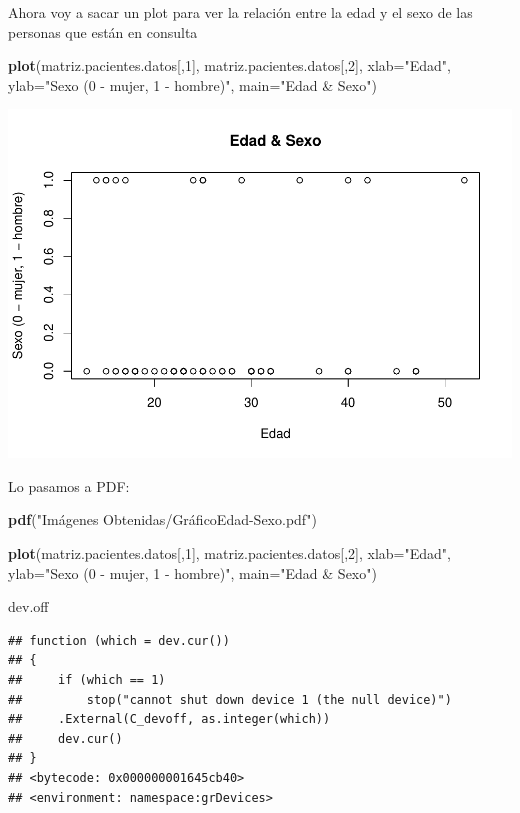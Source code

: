 \documentclass[]{article}
\newenvironment{Shaded}{\begin{snugshade}}{\end{snugshade}}
\newcommand{\DataTypeTok}[1]{\textcolor[rgb]{0.13,0.29,0.53}{#1}}
\newcommand{\DecValTok}[1]{\textcolor[rgb]{0.00,0.00,0.81}{#1}}
\newcommand{\KeywordTok}[1]{\textcolor[rgb]{0.13,0.29,0.53}{\textbf{#1}}}
\newcommand{\NormalTok}[1]{#1}
\newcommand{\StringTok}[1]{\textcolor[rgb]{0.31,0.60,0.02}{#1}}
\begin{document}
Ahora voy a sacar un plot para ver la relación entre la edad y el sexo
de las personas que están en consulta

\begin{Shaded}
\begin{Highlighting}[]
\KeywordTok{plot}\NormalTok{(matriz.pacientes.datos[,}\DecValTok{1}\NormalTok{], matriz.pacientes.datos[,}\DecValTok{2}\NormalTok{], }\DataTypeTok{xlab=}\StringTok{"Edad"}\NormalTok{, }\DataTypeTok{ylab=}\StringTok{"Sexo (0 - mujer, 1 - hombre)"}\NormalTok{, }\DataTypeTok{main=}\StringTok{"Edad & Sexo"}\NormalTok{)}
\end{Highlighting}
\end{Shaded}

\includegraphics{codigo_files/figure-latex/grafico_edad_sexo-1.pdf}

Lo pasamos a PDF:

\begin{Shaded}
\begin{Highlighting}[]
\KeywordTok{pdf}\NormalTok{(}\StringTok{"Imágenes Obtenidas/GráficoEdad-Sexo.pdf"}\NormalTok{)}

\KeywordTok{plot}\NormalTok{(matriz.pacientes.datos[,}\DecValTok{1}\NormalTok{], matriz.pacientes.datos[,}\DecValTok{2}\NormalTok{], }\DataTypeTok{xlab=}\StringTok{"Edad"}\NormalTok{, }\DataTypeTok{ylab=}\StringTok{"Sexo (0 - mujer, 1 - hombre)"}\NormalTok{, }\DataTypeTok{main=}\StringTok{"Edad & Sexo"}\NormalTok{)}

\NormalTok{dev.off}
\end{Highlighting}
\end{Shaded}

\begin{verbatim}
## function (which = dev.cur()) 
## {
##     if (which == 1) 
##         stop("cannot shut down device 1 (the null device)")
##     .External(C_devoff, as.integer(which))
##     dev.cur()
## }
## <bytecode: 0x000000001645cb40>
## <environment: namespace:grDevices>
\end{verbatim}
\end{document}
